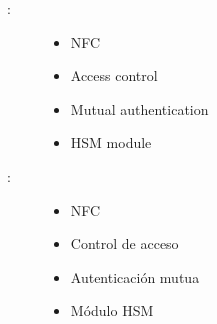 \begin{multicols}{2}
	\begin{description}
		\item[\palabraschaveprincipal:]
		\begin{itemize}
			
				\item NFC
				\item Access control
				\item Mutual authentication
				\item HSM module
		\end{itemize}
	\end{description}
	
	\begin{description}
		\item[\palabraschavesecundaria:]
		\begin{itemize}
			\item NFC
			\item Control de acceso
			\item Autenticación mutua
			\item Módulo HSM
		
		\end{itemize}
	\end{description}
\end{multicols}

